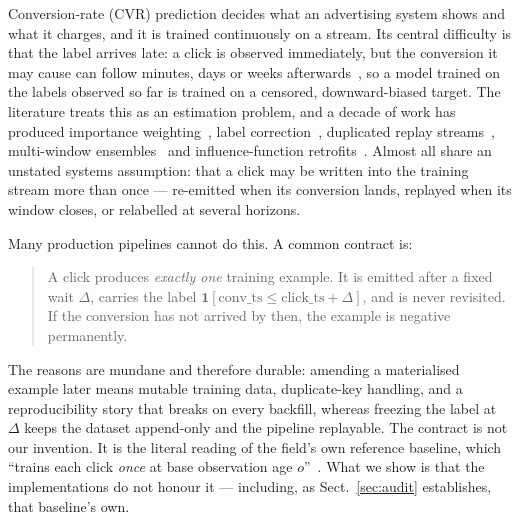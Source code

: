 \documentclass[runningheads]{llncs}
\newcommand{\ind}{\mathbf{1}}
\begin{document}
Conversion-rate (CVR) prediction decides what an advertising system shows and what it charges, and
it is trained continuously on a stream. Its central difficulty is that the label arrives late: a
click is observed immediately, but the conversion it may cause can follow minutes, days or weeks
afterwards~\cite{chapelle2014modeling}, so a model trained on the labels observed so far is trained
on a censored, downward-biased target. The literature treats this as an estimation problem, and a
decade of work has produced importance
weighting~\cite{yasui2020feedback,yang2021capturing}, label
correction~\cite{chen2022asymptotically,wang2023unbiased}, duplicated replay
streams~\cite{ktena2019addressing,gu2021real,dai2023dually}, multi-window
ensembles~\cite{li2021follow,liu2024online,zhang2025personalized} and influence-function
retrofits~\cite{ding2026delayed}. Almost all share an unstated systems assumption: that a click may
be written into the training stream more than once --- re-emitted when its conversion lands,
replayed when its window closes, or relabelled at several horizons.

Many production pipelines cannot do this. A common contract is:

\begin{quote}
A click produces \emph{exactly one} training example. It is emitted after a fixed wait $\Delta$,
carries the label $\ind[\text{conv\_ts} \le \text{click\_ts} + \Delta]$, and is never revisited. If
the conversion has not arrived by then, the example is negative permanently.
\end{quote}

The reasons are mundane and therefore durable: amending a materialised example later means mutable
training data, duplicate-key handling, and a reproducibility story that breaks on every backfill,
whereas freezing the label at $\Delta$ keeps the dataset append-only and the pipeline replayable.
The contract is not our invention. It is the literal reading of the field's own reference baseline,
which ``trains each click \emph{once} at base observation age $o$''~\cite{li2026twice}. What we show
is that the implementations do not honour it --- including, as Sect.~\ref{sec:audit} establishes,
that baseline's own.
\end{document}
